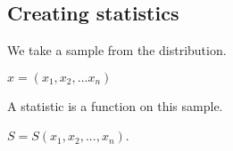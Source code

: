 
\subsection{Creating statistics}

We take a sample from the distribution.

\(x=(x_1, x_2,...x_n)\)

A statistic is a function on this sample.

\(S=S(x_1, x_2,...,x_n)\).

